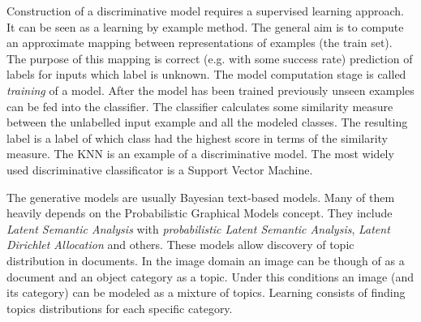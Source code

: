 \documentclass[a4paper,12pt]{article}
\begin{document}
	Construction of a discriminative model requires a supervised learning approach. It can be seen as a learning by example method. The general aim is to compute an approximate mapping between representations of examples (the train set). The purpose of this mapping is correct (e.g. with some success rate) prediction of labels for inputs which label is unknown. The model computation stage is called \emph{training} of a model. After the model has been trained previously unseen examples can be fed into the classifier. The classifier calculates some similarity measure between the unlabelled input example and all the modeled classes. The resulting label is a label of which class had the highest score in terms of the similarity measure. The KNN is an example of a discriminative model. The most widely used discriminative classificator is a Support Vector Machine.
	
	The generative models are usually Bayesian text-based models. Many of them heavily depends on the Probabilistic Graphical Models concept. They include \emph{Latent Semantic Analysis} with \emph{probabilistic Latent Semantic Analysis}, \emph{Latent Dirichlet Allocation} and others. These models allow discovery of topic distribution in documents. In the image domain an image can be though of as a document and an object category as a topic. Under this conditions an image (and its category) can be modeled as a mixture of topics. Learning consists of finding topics distributions for each specific category. 


\end{document}
